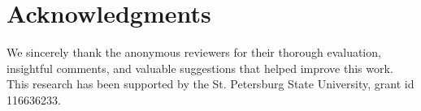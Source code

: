 \section*{Acknowledgments}

We sincerely thank the anonymous reviewers for their thorough evaluation, insightful comments, and valuable suggestions that helped improve this work.
This research has been supported by the St. Petersburg State University, grant id 116636233.